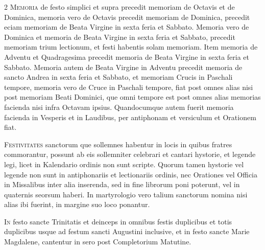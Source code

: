 \begin{multicols*}{2}
{\color{Red} }
\lettrine[lines=2]{\zallmancaps \color{Blue} M}{emoria} de festo simplici et supra precedit memoriam de Octavis et de Dominica, memoria vero de Octavis precedit memoriam de Dominica, precedit eciam memoriam de Beata Virgine in sexta feria et Sabbato.
Memoria vero de Dominica et memoria de Beata Virgine in sexta feria et Sabbato, precedit memoriam trium lectionum, et festi habentis solam memoriam. Item memoria de Adventu et Quadragesima precedit memoria de Beata Virgine in sexta feria et Sabbato.
Memoria autem de Beata Virgine in Adventu precedit memoria de sancto Andrea in sexta feria et Sabbato, et memoriam Crucis in Paschali tempore, memoria vero de Cruce in Paschali tempore, fiat post omnes alias nisi post memoriam Beati Dominici, que omni tempore est post omnes alias memorias facienda nisi infra Octavam ipsius.
Quandocumque autem fuerit memoria facienda in Vesperis et in Laudibus, per antiphonam et versiculum et Orationem fiat.

{\color{Red} }
\lettrine[lines=2]{\zallmancaps \color{Red} F}{estivitates} sanctorum que sollemnes habentur in locis in quibus fratres commorantur, possunt ab eis sollemniter celebrari et cantari hystorie, et legende legi, licet in Kalendario ordinis non sunt scripte. Quorum tamen hystorie vel legende non sunt in antiphonariis et lectionariis ordinis, nec Orationes vel Officia in Missalibus inter alia inserenda, sed in fine librorum poni poterunt, vel in quaternis seorsum haberi.
In martyrologio vero talium sanctorum nomina nisi alias ibi fuerint, in margine suo loco ponantur.

{\color{Red} }
\lettrine[lines=2]{\zallmancaps \color{Blue} I}{n} festo sancte Trinitatis et deinceps in omnibus festis duplicibus et totis duplicibus usque ad festum sancti Augustini inclusive, et in festo sancte Marie Magdalene, cantentur in sero post Completorium Matutine.


\end{multicols*}
